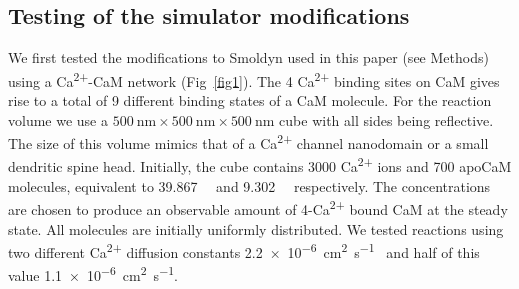 \documentclass[10pt,letterpaper]{article}
\begin{document}
\subsection*{Testing of the simulator modifications}
We first tested the modifications to Smoldyn used in this paper (see Methods) using a Ca\textsuperscript{2+}-CaM network (Fig~\ref{fig1}). The 4 Ca\textsuperscript{2+} binding sites on CaM gives rise to a total of 9 different binding states of a CaM molecule. For the reaction volume we use a $\SI{500}{\nm}\times\SI{500}{\nm}\times\SI{500}{\nm}$ cube with all sides being reflective. The size of this volume mimics that of a Ca\textsuperscript{2+} channel nanodomain or a small dendritic spine head. Initially, the cube contains 3000 Ca\textsuperscript{2+} ions and 700 apoCaM molecules, equivalent to \SI{39.867}{\micro\Molar} and \SI{9.302}{\micro\Molar} respectively. The concentrations are chosen to produce an observable amount of 4-Ca\textsuperscript{2+} bound CaM at the steady state. All molecules are initially uniformly distributed. We tested reactions using two different Ca\textsuperscript{2+} diffusion constants \SI{2.2e-6}{\square\cm\per\s}~\cite{Keller:2008ez} and half of this value \SI{1.1e-6}{\square\cm\per\s}.
\end{document}
